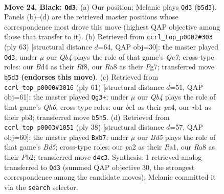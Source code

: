 \documentclass[11pt]{article}
\begin{document}
\clearpage

\begin{figure}[p]\centering
\begin{subfigure}{0.46\textwidth}\centering
\resizebox{\linewidth}{!}{%
\newchessgame
\chessboard[
  setfen={r7/2p2kpp/3p4/1q6/pP1b2Q1/2P5/P4PPP/1RB3K1 b - - 2 24},
  showmover=false,
  pgfstyle=straightmove, color=movearrow, markmove={b5-d3}
]}
\caption{}
\end{subfigure}\hfill
\begin{subfigure}{0.46\textwidth}\centering
\resizebox{\linewidth}{!}{%
\newchessgame
\chessboard[
  setfen={5rk1/1p4p1/8/b1QP1p2/p1P5/5P1N/P1q4P/5R1K b - - 0 32},
  showmover=false,
  pgfstyle=straightmove, color=movearrow, markmove={c2-d3}
]}
\caption{}
\end{subfigure}
\\[4pt]
\begin{subfigure}{0.46\textwidth}\centering
\resizebox{\linewidth}{!}{%
\newchessgame
\chessboard[
  setfen={6k1/p2Q1p2/6pp/1P6/P2b2P1/1Pp4q/4RP2/6K1 b - - 1 31},
  showmover=false,
  pgfstyle=straightmove, color=movearrow, markmove={h3-g3}
]}
\caption{}
\end{subfigure}\hfill
\begin{subfigure}{0.46\textwidth}\centering
\resizebox{\linewidth}{!}{%
\newchessgame
\chessboard[
  setfen={r5k1/1p3ppp/4b3/p2B4/P2Q4/3P4/1PP3Pq/R4K2 w - - 1 20},
  showmover=false,
  pgfstyle=straightmove, color=movearrow, markmove={d5-b7}
]}
\caption{}
\end{subfigure}
\caption{\textbf{Move 24, Black: \texttt{Qd3}.} (a) Our position; Melanie plays \texttt{Qd3} (\texttt{b5d3}). Panels (b)--(d) are the retrieved master positions whose correspondence most drove this move (highest QAP objective among those that transfer to it). (b) Retrieved from \texttt{ccrl\_top\_p0002\#303} (ply 63) [structural distance $d$=64, QAP obj=30]: the master played \texttt{Qd3}; under $\mu$ our \emph{Qb4} plays the role of that game's \emph{Qc7}; cross-type roles: our \emph{B}d4 as their \emph{R}f8, our \emph{R}a8 as their \emph{P}g7; transferred move \texttt{b5d3} \textbf{(endorses this move)}. (c) Retrieved from \texttt{ccrl\_top\_p0000\#3016} (ply 61) [structural distance $d$=51, QAP obj=61]: the master played \texttt{Qg3+}; under $\mu$ our \emph{Qb4} plays the role of that game's \emph{Qh6}; cross-type roles: our \emph{b}c1 as their \emph{p}a4, our \emph{r}b1 as their \emph{p}b3; transferred move \texttt{b5h5}. (d) Retrieved from \texttt{ccrl\_top\_p0003\#1051} (ply 38) [structural distance $d$=57, QAP obj=60]: the master played \texttt{Bxb7}; under $\mu$ our \emph{Bd5} plays the role of that game's \emph{Bd5}; cross-type roles: our \emph{p}a2 as their \emph{R}a1, our \emph{R}a8 as their \emph{P}b2; transferred move \texttt{d4c3}. Synthesis: 1 retrieved analog transferred to \texttt{Qd3} (summed QAP objective 30, the strongest correspondence among the candidate moves); Melanie committed it via the \texttt{search} selector.}
\label{fig:thought-m47}
\end{figure}
\end{document}
